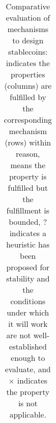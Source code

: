 \begin{table}[t!]
\begin{tabular}{ lllllllll}
	\end{tabular}
	\caption{Comparative evaluation of mechanisms to design stablecoins: {\full} indicates the properties (columns) are fulfilled by the corresponding mechanism (rows) within reason, {\prt} means the property is fulfilled but the fulfillment is bounded, {?} indicates a heuristic has been proposed for stability and the conditions under which it will work are not well-established enough to evaluate, and $\times$ indicates the property is not applicable.
	\label{tab:evframework}}
\end{table}